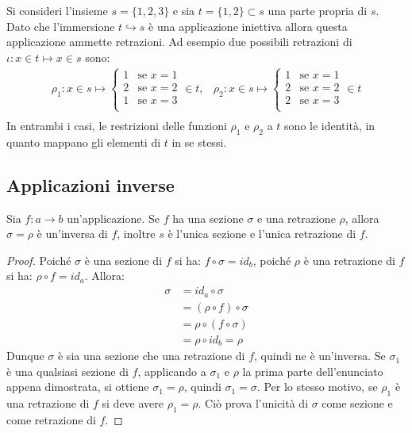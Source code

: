 \begin{example}
	Si consideri l'insieme $s=\{1,2,3\}$ e sia $t=\{1,2\}\subset s$ una parte propria di $s$. Dato che l'immersione $t \hookrightarrow s$ è una applicazione iniettiva allora questa applicazione ammette retrazioni. Ad esempio due possibili retrazioni di $\iota: x \in t \mapsto x \in s$ sono:
	\begin{displaymath}
		\begin{array}{ll}
			\rho_{1} :x \in s \mapsto \left\{ \begin{array}{ll}
				1 & \mbox{se $x=1$} \\
				2 & \mbox{se $x=2$} \\
				1 & \mbox{se $x=3$} \\
			\end{array}
			\right. \in t, &
			\rho_{2} : x \in s \mapsto \left\lbrace \begin{array}{ll}
				1 & \mbox{se $x=1$} \\
				2 & \mbox{se $x=2$} \\
				2 & \mbox{se $x=3$} \\
			\end{array}
			\right. \in t    \\
		\end{array}
	\end{displaymath}
	In entrambi i casi, le restrizioni delle funzioni $\rho_{1}$ e $\rho_{2}$ a $t$ sono le identità, in quanto mappano gli elementi di $t$ in se stessi.
\end{example}

\subsection{Applicazioni inverse}
\begin{teorbox}\label{thm:unicità_inversa}
	Sia $f:a \longrightarrow b$ un'applicazione. Se $f$ ha una sezione $\sigma$ e una retrazione $\rho$, allora $\sigma=\rho$ è un'inversa di $f$, inoltre $s$ è l'unica sezione e l'unica retrazione di $f$.
\end{teorbox}

\begin{proof}
	Poiché $\sigma$ è una sezione di $f$ si ha: $f \circ \sigma = id_{b}$, poiché $\rho$ è una retrazione di $f$ si ha: $\rho \circ f = id_{a}$. Allora:
	\begin{align*}
		\sigma &= id_{a} \circ \sigma \\
		&= (\rho \circ f )\circ \sigma \\
		&= \rho \circ (f \circ \sigma) \\
		&= \rho \circ id_{b} = \rho
	\end{align*}
	Dunque $\sigma$ è sia una sezione che una retrazione di $f$, quindi ne è un'inversa. Se $\sigma_{1}$ è una qualsiasi sezione di $f$, applicando a $\sigma_{1}$ e $\rho$ la prima parte dell'enunciato appena dimostrata, si ottiene $\sigma_{1}=\rho$, quindi $\sigma_{1}=\sigma$. Per lo stesso motivo, se $\rho_{1}$ è una retrazione di $f$ si deve avere $\rho_{1}=\rho$. Ciò prova l'unicità di $\sigma$ come sezione e come retrazione di $f$.
\end{proof}

